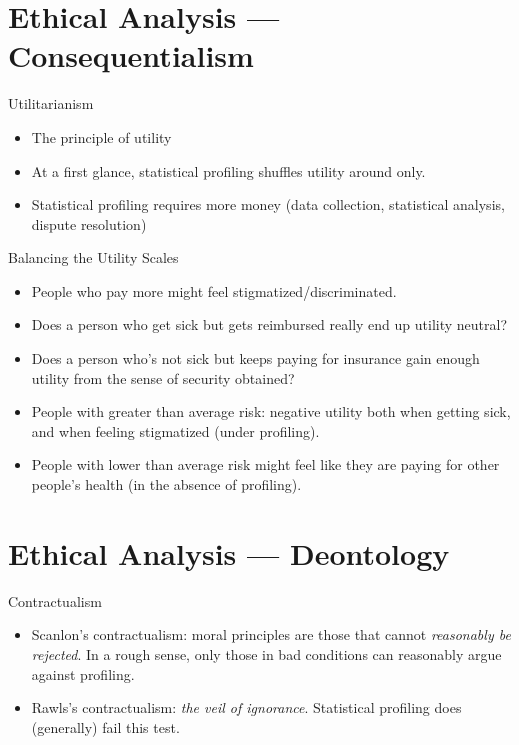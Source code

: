 \section{Ethical Analysis --- Consequentialism}

\begin{frame}{Utilitarianism}
	\begin{itemize}
		\item The principle of utility
		      \pause
		\item At a first glance, statistical profiling shuffles utility around only.
		      \pause
		\item Statistical profiling requires more money (data collection, statistical analysis, dispute resolution)
	\end{itemize}
\end{frame}

\begin{frame}{Balancing the Utility Scales}
	\begin{itemize}
		\item People who pay more might feel stigmatized/discriminated.
		      \pause
		\item Does a person who get sick but gets reimbursed really end up utility neutral?
		\item Does a person who's not sick but keeps paying for insurance gain enough utility from the sense of security obtained?
		      \pause
		\item People with greater than average risk: negative utility both when getting sick, and when feeling stigmatized (under profiling).
		\item People with lower than average risk might feel like they are paying for other people's health (in the absence of profiling).
	\end{itemize}

\end{frame}

\section{Ethical Analysis --- Deontology}

\begin{frame}{Contractualism}
	\begin{itemize}
		\item Scanlon's contractualism: moral principles are those that cannot \emph{reasonably be rejected}. In a rough sense, only those in bad conditions can reasonably argue against profiling.
		      \pause
		\item Rawls's contractualism: \emph{the veil of ignorance}. Statistical profiling does (generally) fail this test.
	\end{itemize}
\end{frame}

